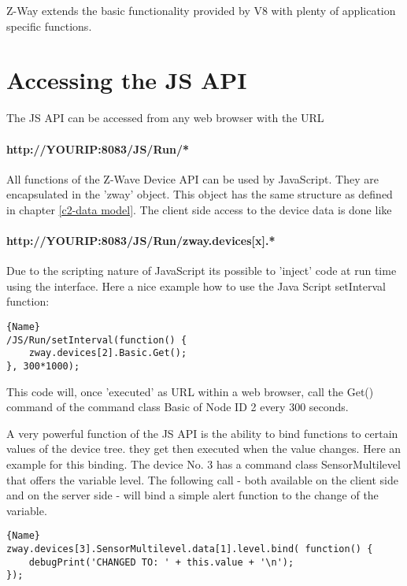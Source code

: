 Z-Way extends the basic functionality provided by V8 with plenty of application 
specific functions.

\section{Accessing the JS API}

The JS API can be accessed from any web browser with the URL

\paragraph{http://YOURIP:8083/JS/Run/*}

All functions of the Z-Wave Device API can be used by JavaScript. They are encapsulated
in the 'zway' object.  This object has the same structure as defined in chapter 
\ref{c2-data model}. 
The client side access to the device data is done like

\paragraph{http://YOURIP:8083/JS/Run/zway.devices[x].*}

Due to the scripting nature of JavaScript its possible to 'inject' code at run time
using the interface. Here a nice example how to use the Java Script 
setInterval function:

\begin{lstlisting}[caption=Polling device \#2]{Name}
/JS/Run/setInterval(function() { 
	zway.devices[2].Basic.Get();
}, 300*1000);
\end{lstlisting}

This code will, once 'executed' as URL within a web browser, call the Get() command
of the command class Basic of Node ID 2 every 300 seconds.  

A very powerful function of the JS API is the ability to bind functions to certain
values of the device tree. they get then executed when the value changes. Here an 
example for this binding. The device No. 3 has a command class SensorMultilevel that offers
the variable level. The following call - both available on the client side 
and on the server side - will bind a simple alert function to the change of 
the variable.

\begin{lstlisting}[caption=Bind a function]{Name}
zway.devices[3].SensorMultilevel.data[1].level.bind( function() { 
	debugPrint('CHANGED TO: ' + this.value + '\n'); 
});  
\end{lstlisting}

